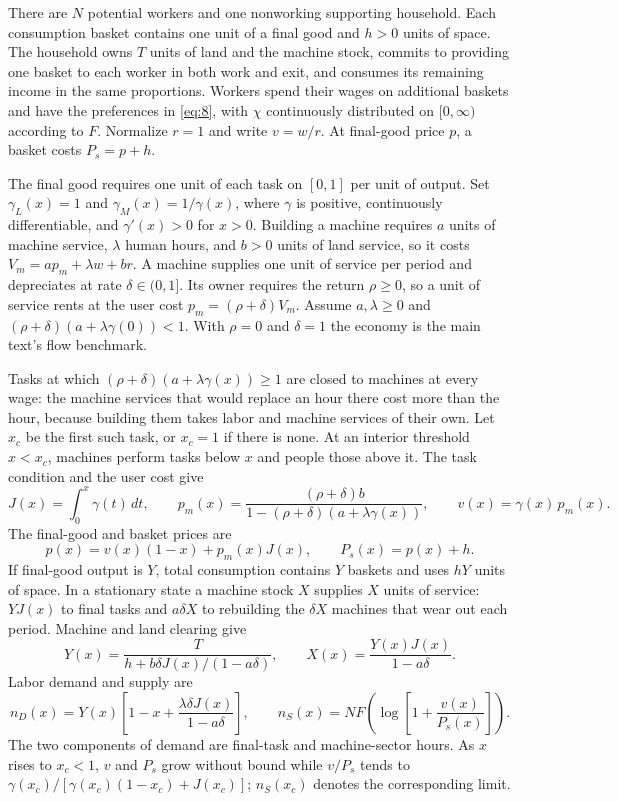 \documentclass[12pt]{article}
\theoremstyle{plain}
\begin{document}
There are $N$ potential workers and one nonworking supporting household. Each consumption basket contains one unit of a final good and $h>0$ units of space. The household owns $T$ units of land and the machine stock, commits to providing one basket to each worker in both work and exit, and consumes its remaining income in the same proportions. Workers spend their wages on additional baskets and have the preferences in \eqref{eq:8}, with $\chi$ continuously distributed on $[0,\infty)$ according to $F$. Normalize $r=1$ and write $v=w/r$. At final-good price $p$, a basket costs $P_s=p+h$.

The final good requires one unit of each task on $[0,1]$ per unit of output. Set $\gamma_L(x)=1$ and $\gamma_M(x)=1/\gamma(x)$, where $\gamma$ is positive, continuously differentiable, and $\gamma'(x)>0$ for $x>0$. Building a machine requires $a$ units of machine service, $\lambda$ human hours, and $b>0$ units of land service, so it costs $V_m=ap_m+\lambda w+br$. A machine supplies one unit of service per period and depreciates at rate $\delta\in(0,1]$. Its owner requires the return $\rho\ge0$, so a unit of service rents at the user cost $p_m=(\rho+\delta)V_m$. Assume $a,\lambda\ge0$ and $(\rho+\delta)(a+\lambda\gamma(0))<1$. With $\rho=0$ and $\delta=1$ the economy is the main text's flow benchmark.

Tasks at which $(\rho+\delta)(a+\lambda\gamma(x))\ge1$ are closed to machines at every wage: the machine services that would replace an hour there cost more than the hour, because building them takes labor and machine services of their own. Let $x_c$ be the first such task, or $x_c=1$ if there is none. At an interior threshold $x<x_c$, machines perform tasks below $x$ and people those above it. The task condition and the user cost give
\begin{equation}\label{eq:21}
J(x)=\int_0^x\gamma(t)\,dt,\qquad
p_m(x)=\frac{(\rho+\delta)b}{1-(\rho+\delta)(a+\lambda\gamma(x))},\qquad
v(x)=\gamma(x)\,p_m(x).
\end{equation}
The final-good and basket prices are
\begin{equation}\label{eq:22}
p(x)=v(x)(1-x)+p_m(x)J(x),\qquad
P_s(x)=p(x)+h.
\end{equation}
If final-good output is $Y$, total consumption contains $Y$ baskets and uses $hY$ units of space. In a stationary state a machine stock $X$ supplies $X$ units of service: $YJ(x)$ to final tasks and $a\delta X$ to rebuilding the $\delta X$ machines that wear out each period. Machine and land clearing give
\begin{equation}\label{eq:23}
Y(x)=\frac{T}{h+b\delta J(x)/(1-a\delta)},\qquad
X(x)=\frac{Y(x)J(x)}{1-a\delta}.
\end{equation}
Labor demand and supply are
\begin{equation}\label{eq:24}
n_D(x)=Y(x)\left[1-x+\frac{\lambda\delta J(x)}{1-a\delta}\right],\qquad
n_S(x)=NF\left(\log\left[1+\frac{v(x)}{P_s(x)}\right]\right).
\end{equation}
The two components of demand are final-task and machine-sector hours. As $x$ rises to $x_c<1$, $v$ and $P_s$ grow without bound while $v/P_s$ tends to $\gamma(x_c)/[\gamma(x_c)(1-x_c)+J(x_c)]$; $n_S(x_c)$ denotes the corresponding limit.
\end{document}
